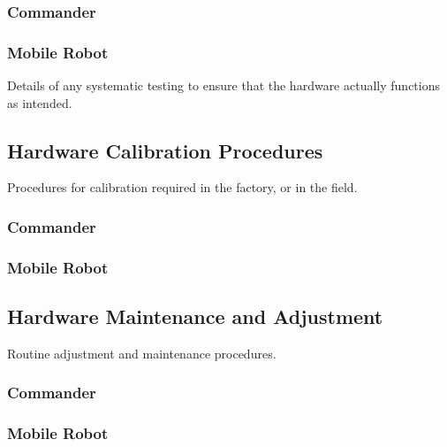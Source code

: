\documentclass[MTRX3700report.tex]{subfiles}
\begin{document}
    \subsubsection{Commander}
    \subsubsection{Mobile Robot}
  Details of any systematic testing to ensure that the hardware actually functions as intended.

  \subsection{Hardware Calibration Procedures}
  Procedures for calibration required in the factory, or in the field.
    \subsubsection{Commander}
    \subsubsection{Mobile Robot}

  \subsection{Hardware Maintenance and Adjustment}
  Routine adjustment and maintenance procedures.
    \subsubsection{Commander}
    \subsubsection{Mobile Robot}
\end{document}
